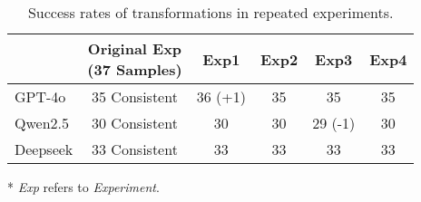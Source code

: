 \begin{table}[ht]
    \centering
    \caption{Success rates of transformations in repeated experiments.}
    \label{tab:eva:rep}
    \begin{threeparttable}
    \begin{tabular}{l|c|cccc}
    \toprule[1.5pt]
    & \makecell[c]{\textbf{Original Exp} \\ \textbf{(37 Samples)}} & \textbf{Exp1} & \textbf{Exp2} & \textbf{Exp3} & \textbf{Exp4} \\
    \midrule[0.8pt]
    GPT-4o & 35 Consistent & 36 (+1) & 35 & 35 & 35 \\
    Qwen2.5 & 30 Consistent & 30 & 30 & 29 (-1) & 30 \\
    Deepseek & 33 Consistent & 33 & 33 & 33 & 33 \\
    \bottomrule[1.5pt]
    \end{tabular}
    \begin{tablenotes}
    \small
    \item[*] \textit{Exp} refers to \textit{Experiment}.
    \end{tablenotes}
    \end{threeparttable}
\end{table}
